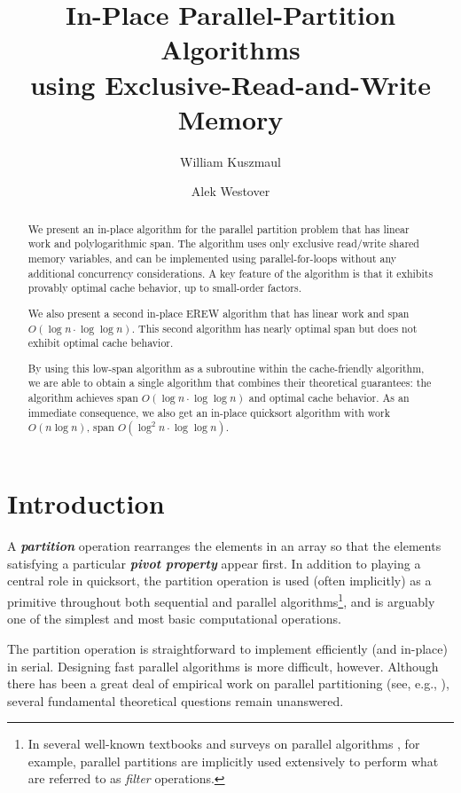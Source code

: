 \documentclass[a4paper,UKenglish,cleveref, autoref, thm-restate]{lipics-v2019}
\title{In-Place Parallel-Partition Algorithms \\using
Exclusive-Read-and-Write Memory} %
\author{William Kuszmaul}{MIT CSAIL, USA}{kuszmaul@mit.edu}{}{Funded by a Hertz Fellowship and an NSF GRFP fellowship.}
\author{Alek Westover}{MIT CSAIL, USA}{alek.westover@gmail.com}{}{}
\newcommand{\defn}[1]{{\textit{\textbf{\boldmath #1}}}}
\begin{document}
\maketitle

\begin{abstract} 
  We present an in-place algorithm for the parallel partition
  problem that has linear work and polylogarithmic span. The algorithm
  uses only exclusive read/write shared memory variables, and can be
  implemented using parallel-for-loops without any additional
  concurrency considerations. A key feature of the algorithm is that
  it exhibits provably optimal cache behavior, up to small-order
  factors.

  We also present a second in-place EREW algorithm that has linear
  work and span $O(\log n \cdot \log \log n)$. This second algorithm
  has nearly optimal span but does not exhibit optimal cache behavior.

  By using this low-span algorithm as a subroutine within the
  cache-friendly algorithm, we are able to obtain a single algorithm
  that combines their theoretical guarantees: the algorithm achieves
  span $O(\log n \cdot \log \log n)$ and optimal cache behavior. As an
  immediate consequence, we also get an in-place quicksort algorithm
  with work $O(n \log n)$, span $O(\log^2 n \cdot \log \log n)$.
\end{abstract}

\clearpage

\section{Introduction}

A \defn{partition} operation rearranges the elements in an array so
that the elements satisfying a particular \defn{pivot property} appear
first. In addition to playing a central role in quicksort, the
partition operation is used (often implicitly) as a primitive
throughout both sequential and parallel algorithms\footnote{In several
  well-known textbooks and surveys on parallel algorithms
  \cite{AcarBl16,Blelloch96}, for example, parallel partitions are
  implicitly used extensively to perform what are referred to as
  \emph{filter} operations.}, and is arguably one of the simplest and
most basic computational operations.

The partition operation is straightforward to implement efficiently
(and in-place) in serial. Designing fast parallel algorithms is more
difficult, however. Although there has been a great deal of empirical
work on parallel partitioning (see, e.g., \cite{HeidelbergerNo90,
  AxtmannWi17, TsigasZh03, FrancisPa92, Frias08}), several fundamental
theoretical questions remain unanswered.
\end{document}
